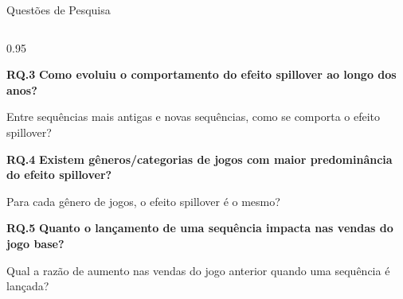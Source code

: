 \begin{frame}{Questões de Pesquisa}
    \vspace{0.0cm}
    
    \begin{columns}[T]
        \begin{column}{0.95\textwidth}
            
            \noindent
            \textbf{RQ.3} \textbf{Como evoluiu o comportamento do efeito spillover ao longo dos anos?}
            
            \vspace{0.0cm}
            \hangindent=1.2cm  
            {\small Entre sequências mais antigas e novas sequências, como se comporta o efeito spillover?}
            \vspace{0.2cm}
            
            \noindent
            \textbf{RQ.4} \textbf{Existem gêneros/categorias de jogos com maior predominância do efeito spillover?}
            
            \vspace{0.0cm}
            \hangindent=1.2cm  
            {\small Para cada gênero de jogos, o efeito spillover é o mesmo?}
            \vspace{0.2cm}

            \noindent
            \textbf{RQ.5} \textbf{Quanto o lançamento de uma sequência impacta nas vendas do jogo base?}
            
            \vspace{0.0cm}
            \hangindent=1.2cm  
            {\small Qual a razão de aumento nas vendas do jogo anterior quando uma sequência é lançada?}
            \vspace{0.2cm}
        \end{column}
    \end{columns}

\end{frame}